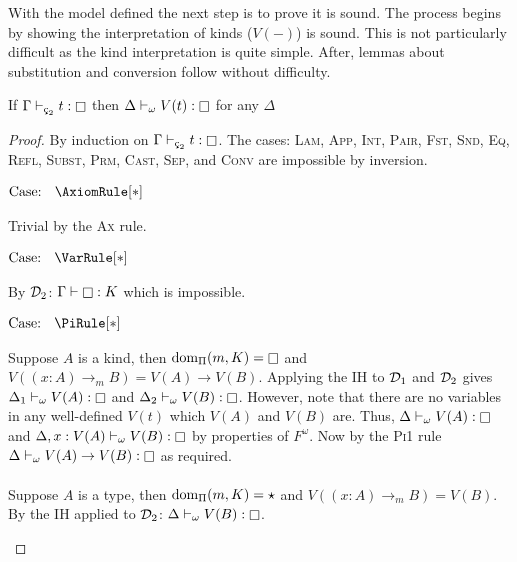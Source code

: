 With the model defined the next step is to prove it is sound.
The process begins by showing the interpretation of kinds ($V(-)$) is sound.
This is not particularly difficult as the kind interpretation is quite simple.
After, lemmas about substitution and conversion follow without difficulty.

\begin{theorem}[Soundness of $V$]
    \label{lem:3:soudness_of_v}
    If $\Gamma \vdash_{\ced} t : \kind$ then $\Delta \vdash_\omega V(t) : \kind$ for any $\Delta$
\end{theorem}
\begin{proof}
    By induction on $\Gamma \vdash_{\ced} t : \kind$.
    The cases: \textsc{Lam}, \textsc{App}, \textsc{Int}, \textsc{Pair}, \textsc{Fst}, \textsc{Snd}, \textsc{Eq}, \textsc{Refl}, \textsc{Subst}, \textsc{Prm}, \textsc{Cast}, \textsc{Sep}, and \textsc{Conv} are impossible by inversion.

    $\text{Case: }\begin{array}{c} \AxiomRule[*] \end{array}$
    \begin{proofcase}
        Trivial by the \textsc{Ax} rule.
    \end{proofcase}

    $\text{Case: }\begin{array}{c} \VarRule[*] \end{array}$
    \begin{proofcase}
        By $\mathcal{D}_{2}$: $\Gamma \vdash \kind : K$ which is impossible.
    \end{proofcase}

    $\text{Case: }\begin{array}{c} \PiRule[*] \end{array}$
    \begin{proofcase}
        Suppose $A$ is a kind, then $\pdom(m, K) = \kind$ and $V((x : A) \to_m B) = V(A) \to V(B)$.
        Applying the IH to $\mathcal{D}_{1}$ and $\mathcal{D}_{2}$ gives $\Delta_1 \vdash_\omega V(A) : \kind$ and $\Delta_2 \vdash_\omega V(B) : \kind$.
        However, note that there are no variables in any well-defined $V(t)$ which $V(A)$ and $V(B)$ are.
        Thus, $\Delta \vdash_\omega V(A) : \kind$ and $\Delta, x : V(A) \vdash_\omega V(B) : \kind$ by properties of $F^\omega$.
        Now by the \textsc{Pi1} rule $\Delta \vdash_\omega V(A) \to V(B) : \kind$ as required.
        \\ \\
        Suppose $A$ is a type, then $\textnormal{dom}_\Pi(m, K) = \star$ and $V((x : A) \to_m B) = V(B)$.
        By the IH applied to $\mathcal{D}_{2}$: $\Delta \vdash_\omega V(B) : \kind$.
    \end{proofcase}
\end{proof}

